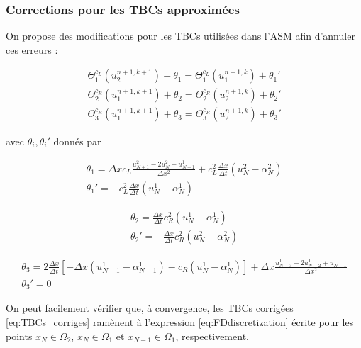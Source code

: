 \subsubsection{Corrections pour les TBCs approximées}

\indent On propose des modifications pour les TBCs utilisées dans l'ASM afin d'annuler ces erreurs :

\begin{equation}
	\label{eq:TBCs_corriges}
    \begin{gathered}
        \Theta_1^{c_L}(u_2^{n+1,k+1}) + \theta_1 = \Theta_1^{c_L}(u_1^{n+1,k}) + \theta_1' \\
        \Theta_2^{c_R}(u_1^{n+1,k+1}) + \theta_2 = \Theta_2^{c_R}(u_2^{n+1,k}) + \theta_2' \\
        \Theta_3^{c_R}(u_1^{n+1,k+1}) + \theta_3 = \Theta_3^{c_R}(u_2^{n+1,k}) + \theta_3'
    \end{gathered}
\end{equation}

\noindent avec $\theta_i, \theta_i'$  donnés par 

\begin{gather*}
    \theta_1 = \Delta x c_L \frac{u_{N+1}^2 - 2u_{N}^2 + u_{N-1}^1}{\Delta x^2} + c_L^2\frac{\Delta x}{\Delta t} \left( u_{N}^2 - \alpha_{N}^2 \right)\\
    \theta_1' = - c_L^2\frac{\Delta x}{\Delta t} \left( u_{N}^1 - \alpha_{N}^1 \right)
\end{gather*}

\begin{equation*}
\begin{gathered}
    \theta_2 = \frac{\Delta x}{\Delta t} c_R^2 (u_N^1 - \alpha_N^1) \\
    \theta_2' = -\frac{\Delta x}{\Delta t} c_R^2 (u_N^2 - \alpha_N^2)
\end{gathered}
\end{equation*}

\begin{equation*}
\begin{gathered}
    \theta_3 = 2\frac{\Delta x}{\Delta t} \left[-\Delta x(u_{N-1}^1 - \alpha_{N-1}^1) - c_R (u_N^1 - \alpha_N^1) \right] + \Delta x \frac{u_{N-3}^1 - 2u_{N-2}^1 + u_{N-1}^1}{\Delta x^2} \\
    \theta_3' = 0
\end{gathered}
\end{equation*}

\indent On peut facilement vérifier que, à convergence, les TBCs corrigées \eqref{eq:TBCs_corriges} ramènent à l'expression \eqref{eq:FDdiscretization} écrite pour les points $x_N \in \Omega_2$, $x_N \in \Omega_1 $ et $x_{N-1} \in \Omega_1$, respectivement. 

